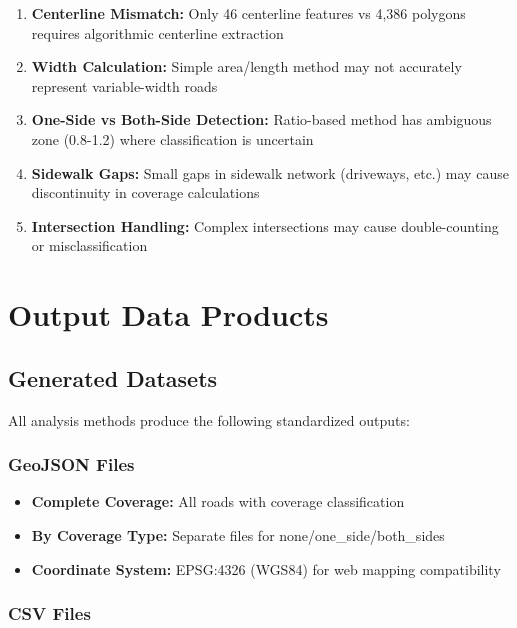\documentclass[11pt,letterpaper]{article}
\begin{document}
\begin{enumerate}
    \item \textbf{Centerline Mismatch:} Only 46 centerline features vs 4,386 polygons requires algorithmic centerline extraction
    \item \textbf{Width Calculation:} Simple area/length method may not accurately represent variable-width roads
    \item \textbf{One-Side vs Both-Side Detection:} Ratio-based method has ambiguous zone (0.8-1.2) where classification is uncertain
    \item \textbf{Sidewalk Gaps:} Small gaps in sidewalk network (driveways, etc.) may cause discontinuity in coverage calculations
    \item \textbf{Intersection Handling:} Complex intersections may cause double-counting or misclassification
\end{enumerate}

\section{Output Data Products}

\subsection{Generated Datasets}

All analysis methods produce the following standardized outputs:

\subsubsection{GeoJSON Files}

\begin{itemize}
    \item \textbf{Complete Coverage:} All roads with coverage classification
    \item \textbf{By Coverage Type:} Separate files for none/one\_side/both\_sides
    \item \textbf{Coordinate System:} EPSG:4326 (WGS84) for web mapping compatibility
\end{itemize}

\subsubsection{CSV Files}
\end{document}
